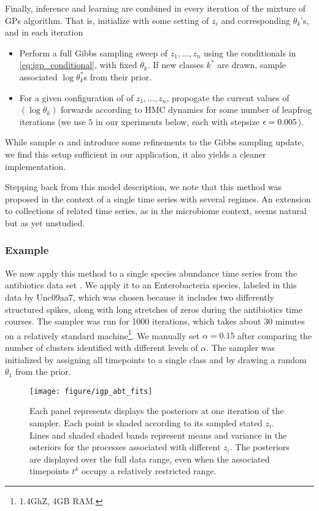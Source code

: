 \documentclass{article}
\begin{document}
Finally, inference and learning are combined in every iteration of the mixture
of GPs algorithm. That is, initialize with some setting of $z_i$ and
corresponding $\theta_k$'s, and in each iteration
\begin{itemize}
\item Perform a full Gibbs sampling sweep of $z_1, \dots, z_n$ using the
  conditionals in \ref{eq:igp_conditional}, with fixed $\theta_k$. If new
  classes $k^\ast$ are drawn, sample associated $\log \theta_k^\ast$s from their
  prior.
\item For a given configuration of of $z_1, \dots, z_n$, propogate the current
  values of $\left(\log \theta_k\right)$ forwards according to HMC dynamics for
  some number of leapfrog iterations (we use $5$ in our xperiments below, each
  with stepsize $\epsilon = 0.005$).
\end{itemize}

While \citep{rasmussen2006gaussian} sample $\alpha$ and introduce some refinements to
the Gibbs sampling update, we find this setup sufficient in our application, it
also yields a cleaner implementation.

Stepping back from this model description, we note that this method was
proposed in the context of a single time series with several regimes. An
extension to collections of related time series, as in the microbiome context,
seems natural but as yet unstudied.

\subsubsection{Example}
\label{subsubsec:igp_mix_example}

We now apply this method to a single species abundance time series from the
antibiotics data set \citep{dethlefsen2011incomplete}. We apply it to an
Enterobacteria species, labeled in this data by Unc09aa7, which was chosen
because it includes two differently structured spikes, along with long stretches
of zeros during the antibiotics time courses. The sampler was run for 1000
iterations, which takes about 30 minutes on a relatively standard
machine\footnote{1.4GhZ, 4GB RAM.}. We manually set $\alpha = 0.15$ after
comparing the number of clusters identified with different levels of $\alpha$.
The sampler was initialized by assigning all timepoints to a single class and by
drawing a random $\theta_1$ from the prior.

\begin{figure}[ht]
  \centering
  \texttt{[image: figure/igp\_abt\_fits]}
  \caption{Each panel represents displays the posteriors at one iteration of the
    sampler. Each point is shaded according to its sampled stated $z_i$. Lines
    and shaded shaded bands represent means and variance in the osteriors for
    the processes associated with different $z_i$. The posteriors are displayed
    over the full data range, even when the associated timepoints $t^k$ occupy a
    relatively restricted range. \label{fig:igp_abt_fits}}
\end{figure}
\end{document}
